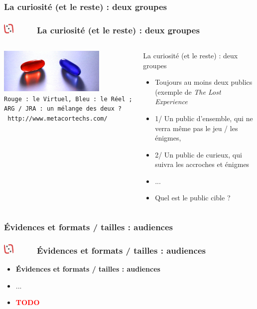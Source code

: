 \documentclass[slidetop,11pt]{beamer}
\def\sectionPartIIbIII{La curiosit{\'e} (et le reste) : deux groupes}
\def\sectionPartIIbIV{{\'E}vidences et formats / tailles : audiences}
\def\moreInFrameTitleLeftt{\includegraphics[height=0.5cm]{img/ligueludique-0.png}~~~~~}
\begin{document}
\subsubsection{\sectionPartIIbIII} %
\begin{frame}
	\frametitle{\moreInFrameTitleLeftt \sectionPartIIbIII }
	\begin{columns}[T]
		\begin{column}[T]{5.10cm}
			\includegraphics[width=5.05cm]{img/ob_0ce702_pillules.jpg}~\\
			\texttt{\footnotesize Rouge : le Virtuel, Bleu : le R{\'e}el ; ARG / JRA : un m{\'e}lange des deux ? }~\\
			\texttt{ http://www.metacortechs.com/ }
		\end{column}
		\begin{column}[T]{5.80cm}
			 \begin{beamerboxesrounded}	[lower=substructureRED, %
							 upper=block title RED,%
							 shadow=true]%
				   {\sectionPartIIbIII}
				\begin{itemize}
					\item Toujours au moins deux publics (exemple de \emph{The Lost Experience}
					\item 1/ Un public d'ensemble, qui ne verra m{\^e}me pas le jeu / les {\'e}nigmes, 
					\item 2/ Un public de curieux, qui suivra les accroches et {\'e}nigmes
					\item ...
					\item Quel est le public cible ?
				\end{itemize}
			\end{beamerboxesrounded}
		\end{column}
	\end{columns}
\end{frame} 

\subsubsection{\sectionPartIIbIV} %
\begin{frame}
	\frametitle{\moreInFrameTitleLeftt \sectionPartIIbIV }
	\begin{itemize}
		\item \textbf{ \sectionPartIIbIV }
		\item[] ...
		\item \textcolor{red}{ \textbf{TODO} }
	\end{itemize}
\end{frame} 
\end{document}
